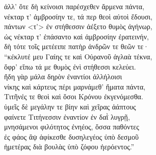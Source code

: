 \begin{pages}
\begin{Leftside}
\quad{}ἀλλ' ὅτε δὴ κείνοισι παρέσχεθεν ἄρμενα πάντα,\\
νέκταρ τ' ἀμβροσίην τε, τά περ θεοὶ αὐτοὶ ἔδουσι, \\
πάντων \textless{}τ'\textgreater{} ἐν στήθεσσιν ἀέξετο θυμὸς ἀγήνωρ,\\
ὡς νέκταρ τ' ἐπάσαντο καὶ ἀμβροσίην ἐρατεινήν,\\
δὴ τότε τοῖς μετέειπε πατὴρ ἀνδρῶν τε θεῶν τε·\\
``κέκλυτέ μευ Γαίης τε καὶ Οὐρανοῦ ἀγλαὰ τέκνα, \\
ὄφρ' εἴπω τά με θυμὸς ἐνὶ στήθεσσι κελεύει.  \\
ἤδη γὰρ μάλα δηρὸν ἐναντίοι ἀλλήλοισι\\
νίκης καὶ κάρτευς πέρι μαρνάμεθ' ἤματα πάντα, \\
Τιτῆνές τε θεοὶ καὶ ὅσοι Κρόνου ἐκγενόμεσθα.\\
ὑμεῖς δὲ μεγάλην τε βίην καὶ χεῖρας ἀάπτους\\
φαίνετε Τιτήνεσσιν ἐναντίον ἐν δαῒ λυγρῇ, \\
μνησάμενοι φιλότητος ἐνηέος, ὅσσα παθόντες\\
ἐς φάος ἂψ ἀφίκεσθε δυσηλεγέος ὑπὸ δεσμοῦ\\
ἡμετέρας διὰ βουλὰς ὑπὸ ζόφου ἠερόεντος.''\\


\end{Leftside}
\end{pages}
